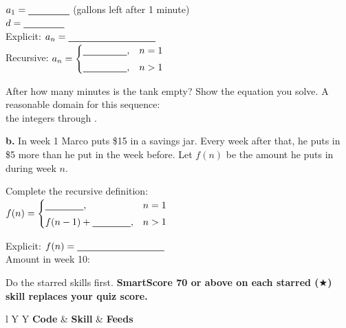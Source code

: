 \begin{minipage}[t]{0.48\textwidth}
\vspace{0pt}
$a_1=\blank[1.5cm]$ (gallons left after 1 minute)\\[6pt]
$d=\blank[1.5cm]$\\[6pt]
Explicit: $a_n=\blank[3.2cm]$\\[8pt]
Recursive: $a_n=\begin{cases}\blank[1.6cm], & n=1\\[3pt] \blank[1.6cm], & n>1\end{cases}$
\end{minipage}\hfill
\begin{minipage}[t]{0.48\textwidth}
\vspace{0pt}
After how many minutes is the tank empty? Show the equation you solve.
\lines[2]
A reasonable domain for this sequence:\\
the integers \blank[1cm] through \blank[1cm].
\end{minipage}

\vspace{6pt}
\textbf{b.} In week 1 Marco puts \$15 in a savings jar. Every week after that, he puts in \$5 more than he put in the week before. Let $f(n)$ be the amount he puts in during week $n$.

\begin{minipage}[t]{0.48\textwidth}
\vspace{0pt}
Complete the recursive definition:\\[4pt]
$f(n)=\begin{cases}\blank[1.4cm], & n=1\\[3pt] f(n-1)+\blank[1.4cm], & n>1\end{cases}$
\end{minipage}\hfill
\begin{minipage}[t]{0.48\textwidth}
\vspace{0pt}
Explicit: $f(n)=\blank[3.2cm]$\\[8pt]
Amount in week 10: \blank[2.5cm]
\lines[1]
\end{minipage}

\newpage
{}
Do the starred skills first. \textbf{SmartScore 70 or above on each starred ($\bigstar$) skill replaces your quiz score.}

\vspace{2pt}
\begin{tabularx}{\textwidth}{l Y Y}
\toprule
\textbf{Code} & \textbf{Skill} & \textbf{Feeds} \\
\midrule
{}
\bottomrule
\end{tabularx}

